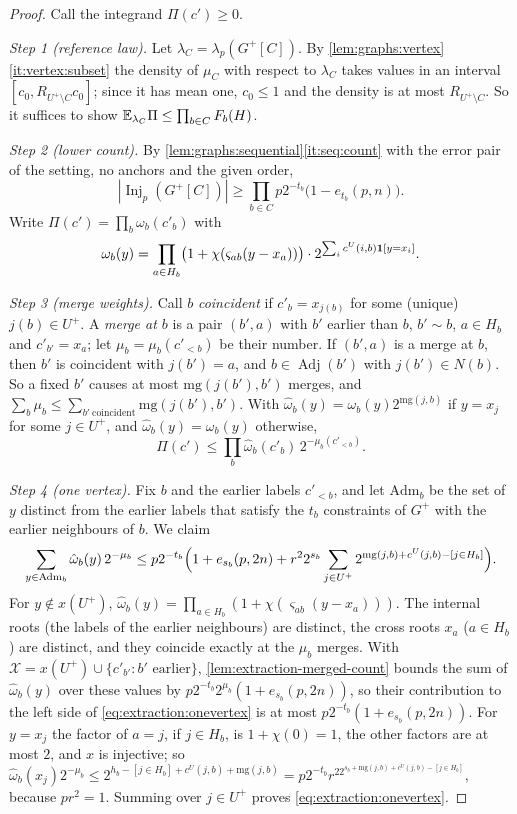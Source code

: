\begin{proof}
Call the integrand $\Pi(c')\ge0$.

\emph{Step 1 (reference law).} Let $\lambda_C=\lambda_p(G^+[C])$. By
\cref{lem:graphs:vertex}\ref{it:vertex:subset} the density of $\mu_C$ with respect
to $\lambda_C$ takes values in an interval $[c_0,R_{U^+\setminus C}c_0]$; since it has
mean one, $c_0\le1$ and the density is at most $R_{U^+\setminus C}$. So it suffices
to show $\mathbb E_{\lambda_C}\Pi\le\prod_{b\in C}F_b(H)$.

\emph{Step 2 (lower count).} By \cref{lem:graphs:sequential}\ref{it:seq:count}
with the error pair of the setting, no anchors and the given order,
\[
 |\operatorname{Inj}_p(G^+[C])|\ge\prod_{b\in C}p2^{-t_b}\bigl(1-e_{t_b}(p,n)\bigr).
\]
Write $\Pi(c')=\prod_b\omega_b(c'_b)$ with
\[
 \omega_b(y)=\prod_{a\in H_b}\bigl(1+\chi(\varsigma_{ab}(y-x_a))\bigr)\cdot
 2^{\sum_ic^U(i,b)\mathbf 1[y=x_i]}.
\]

\emph{Step 3 (merge weights).} Call $b$ \emph{coincident} if $c'_b=x_{j(b)}$ for
some (unique) $j(b)\in U^+$. A \emph{merge at $b$} is a pair $(b',a)$ with $b'$
earlier than $b$, $b'\sim b$, $a\in H_b$ and $c'_{b'}=x_a$; let
$\mu_b=\mu_b(c'_{<b})$ be their number. If $(b',a)$ is a merge at $b$, then
$b'$ is coincident with $j(b')=a$, and $b\in\operatorname{Adj}(b')$ with
$j(b')\in N(b)$. So a fixed $b'$ causes at most $\mathrm{mg}(j(b'),b')$
merges, and $\sum_b\mu_b\le\sum_{b'\ \text{coincident}}\mathrm{mg}(j(b'),b')$. With $\hat\omega_b(y)=\omega_b(y)2^{\mathrm{mg}(j,b)}$ if
$y=x_j$ for some $j\in U^+$, and $\hat\omega_b(y)=\omega_b(y)$ otherwise,
\[
 \Pi(c')\le\prod_b\hat\omega_b(c'_b)\,2^{-\mu_b(c'_{<b})}.
\]

\emph{Step 4 (one vertex).} Fix $b$ and the earlier labels $c'_{<b}$, and let
$\mathrm{Adm}_b$ be the set of $y$ distinct from the earlier labels that satisfy the
$t_b$ constraints of $G^+$ with the earlier neighbours of $b$. We claim
\begin{equation}\label{eq:extraction:onevertex}
 \sum_{y\in\mathrm{Adm}_b}\hat\omega_b(y)\,2^{-\mu_b}\le p2^{-t_b}
 \Bigl(1+e_{s_b}(p,2n)+r^22^{s_b}\sum_{j\in U^+}
 2^{\mathrm{mg}(j,b)+c^U(j,b)-[j\in H_b]}\Bigr).
\end{equation}
For $y\notin x(U^+)$, $\hat\omega_b(y)=\prod_{a\in H_b}(1+\chi(\varsigma_{ab}(y-x_a)))$.
The internal roots (the labels of the earlier neighbours) are distinct, the cross
roots $x_a$ ($a\in H_b$) are distinct, and they coincide exactly at the $\mu_b$
merges. With $\mathcal X=x(U^+)\cup\{c'_{b'}:b'\text{ earlier}\}$,
\cref{lem:extraction-merged-count} bounds the sum of $\hat\omega_b(y)$ over these
values by $p2^{-t_b}2^{\mu_b}(1+e_{s_b}(p,2n))$, so their contribution to the left
side of \eqref{eq:extraction:onevertex} is at most $p2^{-t_b}(1+e_{s_b}(p,2n))$. For $y=x_j$ the factor of $a=j$, if
$j\in H_b$, is $1+\chi(0)=1$, the other factors are at most $2$, and $x$ is
injective; so
$\hat\omega_b(x_j)2^{-\mu_b}\le2^{h_b-[j\in H_b]+c^U(j,b)+\mathrm{mg}(j,b)}
=p2^{-t_b}r^22^{s_b+\mathrm{mg}(j,b)+c^U(j,b)-[j\in H_b]}$, because $pr^2=1$.
Summing over $j\in U^+$ proves \eqref{eq:extraction:onevertex}.


\end{proof}
